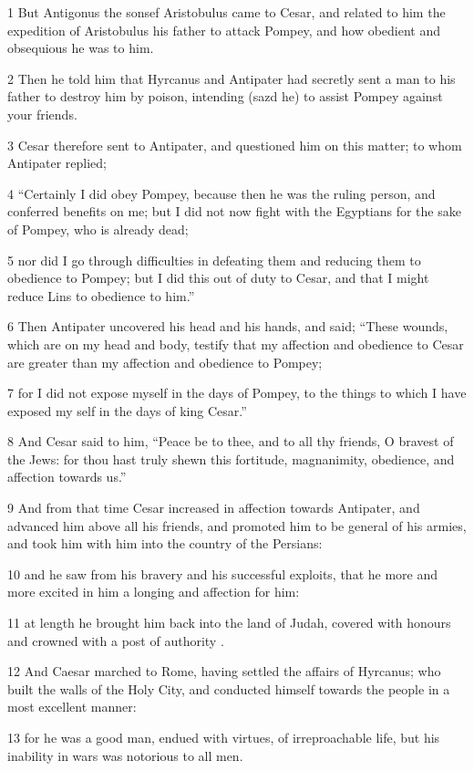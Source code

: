 1 But Antigonus the sonsef Aristobulus came to Cesar, and related to him the expedition of Aristobulus his father to attack Pompey, and how obedient and obsequious he was to him. 

2 Then he told him that Hyrcanus and Antipater had secretly sent a man to his father to destroy him by poison, intending (sazd he) to assist Pompey against your friends. 

3 Cesar therefore sent to Antipater, and questioned him on this matter; to whom Antipater replied; 

4 “Certainly I did obey Pompey, because then he was the ruling person, and conferred benefits on me; but I did not now fight with the Egyptians for the sake of Pompey, who is already dead; 

5 nor did I go through difficulties in defeating them and reducing them to obedience to Pompey; but I did this out of duty to Cesar, and that I might reduce Lins to obedience to him.” 

6 Then Antipater uncovered his head and his hands, and said; “These wounds, which are on my head and body, testify that my affection and obedience to Cesar are greater than my affection and obedience to Pompey; 

7 for I did not expose myself in the days of Pompey, to the things to which I have exposed my self in the days of king Cesar.” 

8 And Cesar said to him, “Peace be to thee, and to all thy friends, O bravest of the Jews: for thou hast truly shewn this fortitude, magnanimity, obedience, and affection towards us.” 

9 And from that time Cesar increased in affection towards Antipater, and advanced him above all his friends, and promoted him to be general of his armies, and took him with him into the country of the Persians: 

10 and he saw from his bravery and his successful exploits, that he more and more excited in him a longing and affection for him: 

11 at length he brought him back into the land of Judah, covered with honours and crowned with a post of authority . 

12 And Caesar marched to Rome, having settled the affairs of Hyrcanus; who built the walls of the Holy City, and conducted himself towards the people in a most excellent manner: 

13 for he was a good man, endued with virtues, of irreproachable life, but his inability in wars was notorious to all men. 


